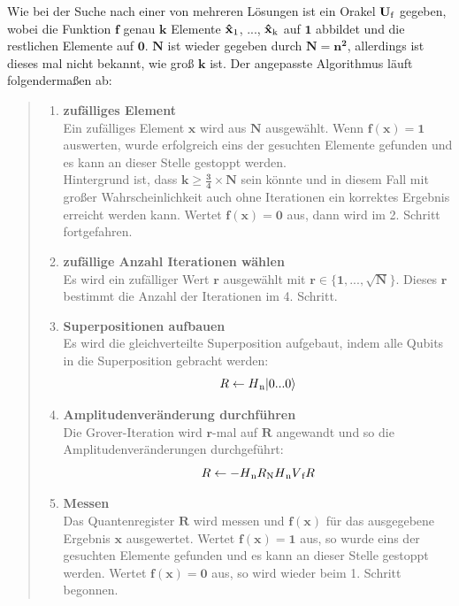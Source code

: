Wie bei der Suche nach einer von mehreren Lösungen ist ein Orakel $\mathbf{U \textsubscript{f}}$ gegeben, wobei die Funktion $\mathbf{f}$ genau $\mathbf{k}$ Elemente $\mathbf{\hat x \textsubscript{1}}$, ..., $\mathbf{\hat x \textsubscript{k}}$ auf $\mathbf{1}$ abbildet und die restlichen Elemente auf $\mathbf{0}$. $\mathbf{N}$ ist wieder gegeben durch $\mathbf{N = n^2}$, allerdings ist dieses mal nicht bekannt, wie groß $\mathbf{k}$ ist. Der angepasste Algorithmus läuft folgendermaßen ab:
\begin{quote}
	\begin{enumerate}
		\item \textbf{zufälliges Element}
		\\
		Ein zufälliges Element $\mathbf{x}$ wird aus $\mathbf{N}$ ausgewählt. Wenn $\mathbf{f(x) = 1}$ auswerten, wurde erfolgreich eins der gesuchten Elemente gefunden und es kann an dieser Stelle gestoppt werden. 
		\\
		Hintergrund ist, dass $\mathbf{k \geq \frac{3}{4} \times N}$ sein könnte und in diesem Fall mit großer Wahrscheinlichkeit auch ohne Iterationen ein korrektes Ergebnis erreicht werden kann. Wertet $\mathbf{f(x) = 0}$ aus, dann wird im 2. Schritt fortgefahren.
		\item \textbf{zufällige Anzahl Iterationen wählen}
		\\
		Es wird ein zufälliger Wert $\mathbf{r}$ ausgewählt mit $\mathbf{r \in \{ 1, ..., \sqrt{N} \}}$. Dieses $\mathbf{r}$ bestimmt die Anzahl der Iterationen im 4. Schritt.
		\item \textbf{Superpositionen aufbauen}
		\\
		Es wird die gleichverteilte Superposition aufgebaut, indem alle Qubits in die Superposition gebracht werden:
		\begin{equation}
			R \leftarrow H\textsubscript{n} |0 ... 0\rangle 
		\end{equation}
		\item \textbf{Amplitudenveränderung durchführen}
		\\
		Die Grover-Iteration wird $\mathbf{r}$-mal auf $\mathbf{R}$ angewandt und so die Amplitudenveränderungen durchgeführt:
		\begin{equation}
			R \leftarrow -H\textsubscript{n} R\textsubscript{N} H\textsubscript{n} V\textsubscript{f} R
		\end{equation}
		\item \textbf{Messen}
		\\
		Das Quantenregister $\mathbf{R}$ wird messen und $\mathbf{f(x)}$ für das ausgegebene Ergebnis $\mathbf{x}$ ausgewertet. Wertet $\mathbf{f(x) = 1}$ aus, so wurde eins der gesuchten Elemente gefunden und es kann an dieser Stelle gestoppt werden. Wertet $\mathbf{f(x) = 0}$ aus, so wird wieder beim 1. Schritt begonnen.
	\end{enumerate}
\end{quote}

